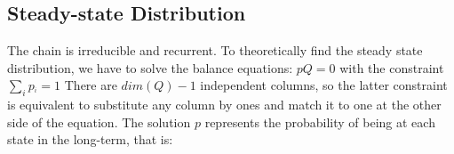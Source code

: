 \documentclass[conference]{IEEEtran}
\begin{document}
\bigskip


\subsection{Steady-state Distribution}

The chain is irreducible and recurrent. To theoretically find the steady state distribution, we have to solve the balance equations: \( pQ=0  \) with the constraint  \(  \sum_{i} {p_^{i}}=1   \) There are \( dim(Q) - 1 \)  independent columns, so the latter constraint is equivalent to substitute any column by ones and match it to one at the other side of the equation. The solution  \( p \) represents the probability of being at each state in the long-term, that is:
 
 

\bigskip
\end{document}
